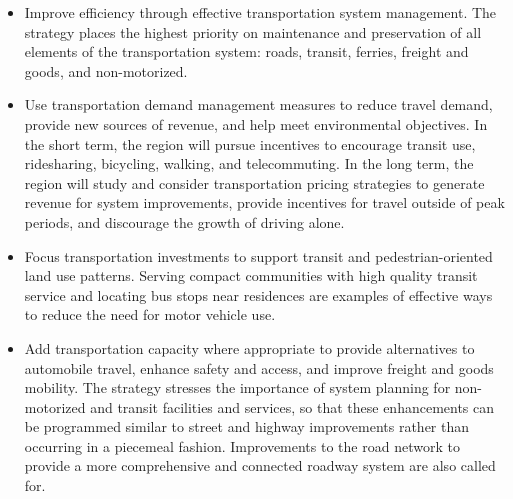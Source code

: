 \begin{itemize}
\item   Improve efficiency through effective transportation system management. The strategy places the highest priority on maintenance and preservation of all elements of the transportation system: roads, transit, ferries, freight and goods, and non-motorized.
\item   Use transportation demand management measures to reduce travel demand, provide new sources of revenue, and help meet environmental objectives.  In the short term, the region will pursue incentives to encourage transit use, ridesharing, bicycling, walking, and telecommuting. In the long term, the region will study and consider transportation pricing strategies to generate revenue for system improvements, provide incentives for travel outside of peak periods, and discourage the growth of driving alone.
\item   Focus transportation investments to support transit and pedestrian-oriented land use patterns. Serving compact communities with high quality transit service and locating bus stops near residences are examples of effective ways to reduce the need for motor vehicle use.
\item   Add transportation capacity where appropriate to provide alternatives to automobile travel, enhance safety and access, and improve freight and goods mobility. The strategy stresses the importance of system planning for non-motorized and transit facilities and services, so that these enhancements can be programmed similar to street and highway improvements rather than occurring in a piecemeal fashion. Improvements to the road network to provide a more comprehensive and connected roadway system are also called for.
\end{itemize}

